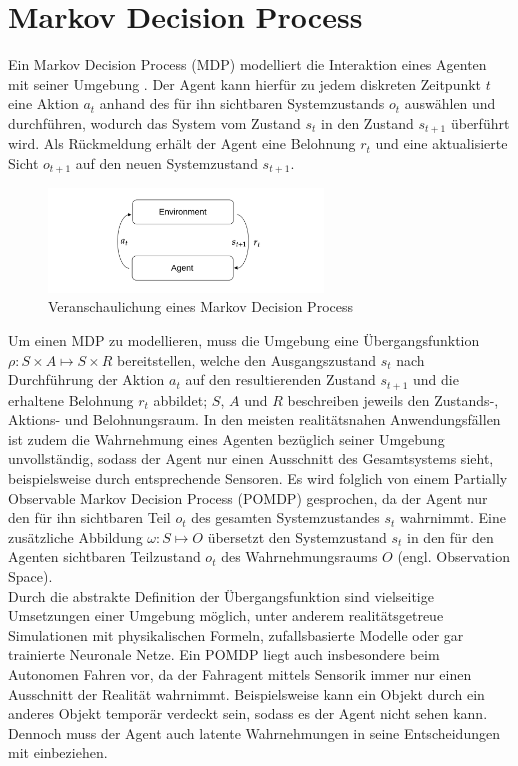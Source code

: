 
\section{Markov Decision Process}
Ein Markov Decision Process (MDP) modelliert die Interaktion eines Agenten mit seiner Umgebung
\cite{sutton1998rlintro}. Der Agent kann hierfür zu jedem diskreten Zeitpunkt $t$ eine
Aktion $a_t$ anhand des für ihn sichtbaren Systemzustands $o_{t}$ auswählen und durchführen,
wodurch das System vom Zustand $s_t$ in den Zustand $s_{t+1}$ überführt wird.
Als Rückmeldung erhält der Agent eine Belohnung $r_t$ und eine aktualisierte
Sicht $o_{t+1}$ auf den neuen Systemzustand $s_{t+1}$.\\

\begin{figure}[h]
  \centering
  \includegraphics[width = 0.65\textwidth]{imgs/markov_decision_process}
  \caption{Veranschaulichung eines Markov Decision Process}
  \label{fig:MDP}
\end{figure}

Um einen MDP zu modellieren, muss die Umgebung eine Übergangsfunktion
$\rho: S \times A \mapsto S \times R$ bereitstellen, welche den Ausgangszustand $s_t$
nach Durchführung der Aktion $a_t$ auf den resultierenden Zustand $s_{t+1}$
und die erhaltene Belohnung $r_t$ abbildet; $S$, $A$ und $R$ beschreiben jeweils
den Zustands-, Aktions- und Belohnungsraum.
In den meisten realitätsnahen Anwendungsfällen ist zudem die Wahrnehmung eines Agenten
bezüglich seiner Umgebung unvollständig, sodass der Agent nur einen Ausschnitt
des Gesamtsystems sieht, beispielsweise durch entsprechende Sensoren. Es wird folglich
von einem Partially Observable Markov Decision Process (POMDP) gesprochen,
da der Agent nur den für ihn sichtbaren Teil $o_t$ des gesamten Systemzustandes
$s_t$ wahrnimmt. Eine zusätzliche Abbildung $\omega: S \mapsto O$ übersetzt den
Systemzustand $s_t$ in den für den Agenten sichtbaren Teilzustand $o_t$ des
Wahrnehmungsraums $O$ (engl. Observation Space).\\

Durch die abstrakte Definition der Übergangsfunktion sind vielseitige Umsetzungen
einer Umgebung möglich, unter anderem realitätsgetreue Simulationen mit physikalischen
Formeln, zufallsbasierte Modelle oder gar trainierte Neuronale Netze.
Ein POMDP liegt auch insbesondere beim Autonomen Fahren vor, da der Fahragent mittels
Sensorik immer nur einen Ausschnitt der Realität wahrnimmt. Beispielsweise kann
ein Objekt durch ein anderes Objekt temporär verdeckt sein, sodass es der Agent
nicht sehen kann. Dennoch muss der Agent auch latente Wahrnehmungen in seine
Entscheidungen mit einbeziehen.\\

